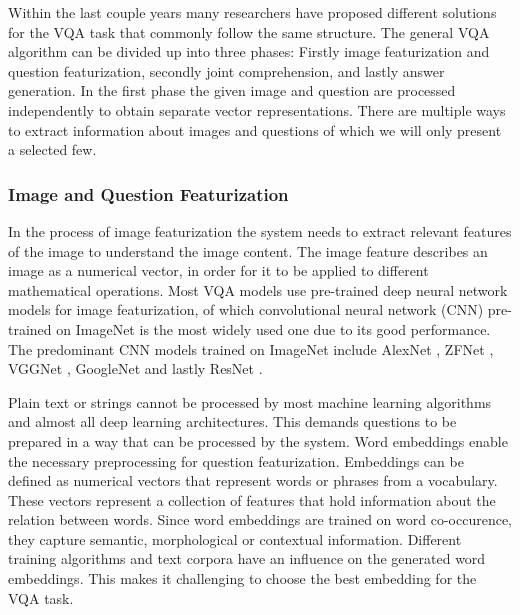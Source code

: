 \documentclass{article}
\begin{document}
Within the last couple years many researchers have proposed different solutions for the VQA task that commonly follow the same structure. The general VQA algorithm can be divided up into three phases: Firstly image featurization and question featurization, secondly joint comprehension, and lastly answer generation.
In the first phase the given image and question are processed independently to obtain separate vector representations. There are multiple ways to extract information about images and questions of which we will only present a selected few.

\subsubsection{Image and Question Featurization}

In the process of image featurization the system needs to extract relevant features of the image to understand the image content. The image feature describes an image as a numerical vector, in order for it to be applied to different mathematical operations. Most VQA models use pre-trained deep neural network models for image featurization, of which convolutional neural network (CNN) \citep{krizhevsky2012imagenet} pre-trained on ImageNet \citep{russakovsky2015imagenet} is the most widely used one due to its good performance. The predominant CNN models trained on ImageNet include AlexNet \citep{krizhevsky2012imagenet}, ZFNet \citep{zeiler2014visual}, VGGNet \citep{simonyan2015very}, GoogleNet \citep{szegedy2015going} and lastly ResNet \citep{residual}.

Plain text or strings cannot be processed by most machine learning algorithms and almost all deep learning architectures. This demands questions to be prepared in a way that can be processed by the system. Word embeddings enable the necessary preprocessing for question featurization. Embeddings can be defined as numerical vectors that represent words or phrases from a vocabulary. These vectors represent a collection of features that hold information about the relation between words. Since word embeddings are trained on word co-occurence, they capture semantic, morphological or contextual information. Different training algorithms and text corpora have an influence on the generated word embeddings. This makes it challenging to choose the best embedding for the VQA task.
\end{document}
